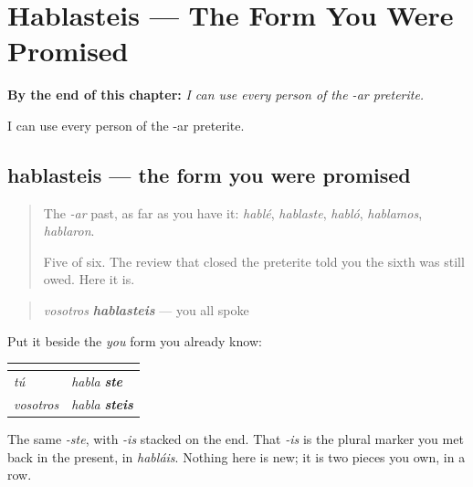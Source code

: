 
\chapter{Hablasteis --- The Form You Were Promised}
\label{ch:hablasteis}

\begin{chapteropening}
\textbf{By the end of this chapter:} \emph{I can use every person of the -ar preterite.}

I can use every person of the -ar preterite.
\end{chapteropening}

\section[hablasteis]{hablasteis — the form you were promised}

\label{lesson:ES-C63-hablasteis}



\begin{quote}
The \emph{-ar} past, as far as you have it: \emph{hablé}, \emph{hablaste}, \emph{habló}, \emph{hablamos}, \emph{hablaron}.

Five of six. The review that closed the preterite told you the sixth was still owed. Here it is.
\end{quote}

\begin{grammarlens}[title={Grammar Lens: -steis}]
\begin{quote}
\emph{vosotros} \emph{\textbf{hablasteis}} — you all spoke
\end{quote}

Put it beside the \emph{you} form you already know:

\noindent
\begin{tabularx}{\linewidth}{@{}>{\raggedright\arraybackslash}X>{\raggedright\arraybackslash}X@{}}
\toprule
\textbf{} & \textbf{} \\
\midrule
\emph{tú} & \emph{habla} \emph{\textbf{ste}} \\
\emph{vosotros} & \emph{habla} \emph{\textbf{steis}} \\
\bottomrule
\end{tabularx}

The same \emph{-ste}, with \emph{-is} stacked on the end. That \emph{-is} is the plural marker you met back in the present, in \emph{habláis}. Nothing here is new; it is two pieces you own, in a row.
\end{grammarlens}

